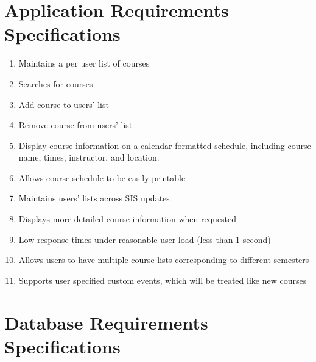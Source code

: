 \documentclass[pdftex,12pt,letter]{article}
\begin{document}
\section*{Application Requirements Specifications}
\begin{enumerate}[1.]
\item Maintains a per user list of courses
\item Searches for courses
\item Add course to users' list
\item Remove course from users' list
\item Display course information on a calendar-formatted schedule, including course name, times, instructor, and location.
\item Allows course schedule to be easily printable
\item Maintains users' lists across SIS updates
\item Displays more detailed course information when requested
\item Low response times under reasonable user load (less than 1 second)
\item Allows users to have multiple course lists corresponding to different semesters
\item Supports user specified custom events, which will be treated like new courses
\end{enumerate}
\section*{Database Requirements Specifications}
\end{document}
